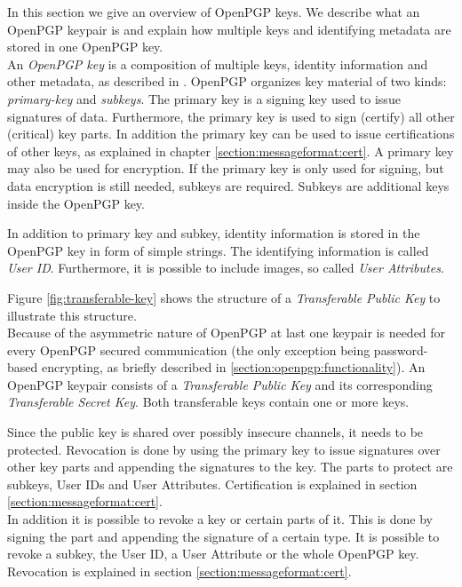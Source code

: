 In this section we give an overview of OpenPGP keys. We describe what an OpenPGP keypair is and explain how multiple keys and identifying metadata are stored in one OpenPGP key. \\

An \textit{OpenPGP key} is a composition of multiple keys, identity information and other metadata, as described in  \cite[section 11.1]{RFC4880}. OpenPGP organizes key material of two kinds: \textit{primary-key} and \textit{subkeys}. The primary key is a signing key used to issue signatures of data. Furthermore, the primary key is used to sign (certify) all other (critical) key parts. In addition the primary key can be used to issue certifications of other keys, as explained in chapter \ref{section:messageformat:cert}. A primary key may also be used for encryption. If the primary key is only used for signing, but data encryption is still needed, subkeys are required. Subkeys are additional keys inside the OpenPGP key. 

In addition to primary key and subkey, identity information is stored in the OpenPGP key in form of simple strings. The identifying information is called \textit{User ID}. Furthermore, it is possible to include images, so called \textit{User Attributes}. 

Figure \ref{fig:transferable-key} shows the structure of a \textit{Transferable Public Key} to illustrate this structure. \\

Because of the  asymmetric nature of OpenPGP at last one keypair is needed for every OpenPGP secured communication (the only exception being password-based encrypting, as briefly described in \ref{section:openpgp:functionality}). An OpenPGP keypair consists of a \textit{Transferable Public Key} and its corresponding \textit{Transferable Secret Key}. Both transferable keys contain one or more keys. 


Since the public key is shared over possibly insecure channels, it needs to be protected. Revocation is done by using the primary key to issue signatures over other key parts and appending the signatures to the key. The parts to protect are subkeys, User IDs and User Attributes. Certification is explained in section \ref{section:messageformat:cert}. \\


In addition it is possible to revoke a key or certain parts of it. This is done by signing the part and appending the signature of a certain type. It is possible to revoke a subkey, the User ID, a User Attribute or the whole OpenPGP key. Revocation is explained in section \ref{section:messageformat:cert}.

